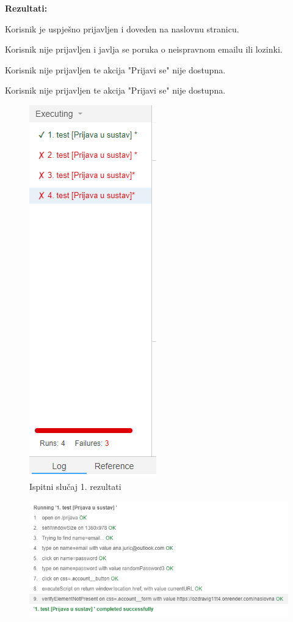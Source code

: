 \noindent \textbf{Rezultati:}
\begin{packed_enum}
	\item Korisnik je uspješno prijavljen i doveden na naslovnu stranicu.
	\item Korisnik nije prijavljen i javlja se poruka o neispravnom emailu ili lozinki.
	\item Korisnik nije prijavljen te akcija "Prijavi se" nije dostupna.
	\item Korisnik nije prijavljen te akcija "Prijavi se" nije dostupna.
\end{packed_enum}

\begin{figure}[H]
	\includegraphics[scale=0.6]{dijagrami/test1.PNG}
	\centering
	\caption{Ispitni slučaj 1. rezultati}
	\label{fig:myChart}
\end{figure}

\begin{figure}[H]
	\includegraphics[scale=0.6]{dijagrami/test11.PNG}
	\centering
	\label{fig:myChart}
\end{figure}

